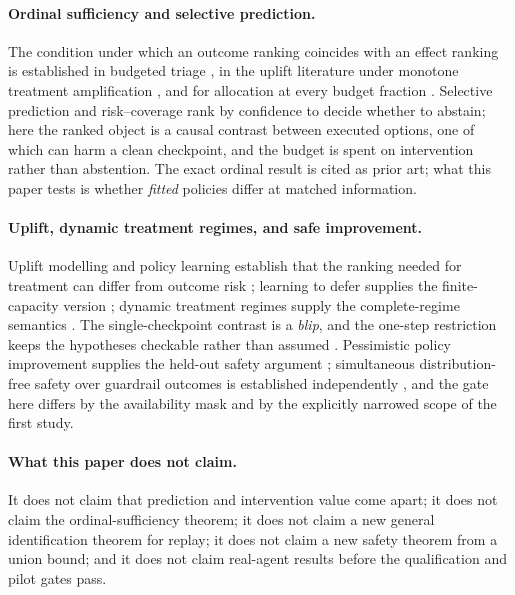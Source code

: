 \paragraph{Ordinal sufficiency and selective prediction.}
The condition under which an outcome ranking coincides with an effect ranking is
established in budgeted triage \citep{okati2021}, in the uplift literature under
monotone treatment amplification \citep{fernandezloria2022}, and for allocation
at every budget fraction \citep{kamran2024}.  Selective prediction and
risk--coverage rank by confidence to decide whether to abstain; here the ranked
object is a causal contrast between executed options, one of which can harm a
clean checkpoint, and the budget is spent on intervention rather than
abstention.  The exact ordinal result is cited as prior art; what this paper
tests is whether \emph{fitted} policies differ at matched information.

\paragraph{Uplift, dynamic treatment regimes, and safe improvement.}
Uplift modelling and policy learning establish that the ranking needed for
treatment can differ from outcome risk
\citep{rzepakowski2012,kitagawa2018,atheywager2021}; learning to defer supplies
the finite-capacity version \citep{madras2018,mozannar2020}; dynamic treatment
regimes supply the complete-regime semantics
\citep{murphy2003,murphybingham2009}.  The single-checkpoint contrast is a
\emph{blip}, and the one-step restriction keeps the hypotheses checkable rather
than assumed \citep{deepblip2025}.  Pessimistic policy improvement supplies the
held-out safety argument \citep{laroche2019,kumar2020,xie2021}; simultaneous
distribution-free safety over guardrail outcomes is established independently
\citep{snpl2025}, and the gate here differs by the availability mask and by the
explicitly narrowed scope of the first study.

\paragraph{What this paper does not claim.}
It does not claim that prediction and intervention value come apart; it does not
claim the ordinal-sufficiency theorem; it does not claim a new general
identification theorem for replay; it does not claim a new safety theorem from a
union bound; and it does not claim real-agent results before the qualification
and pilot gates pass.
